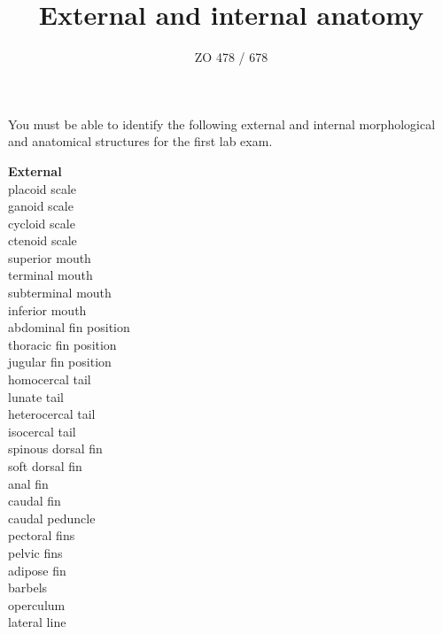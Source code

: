 \documentclass[12pt, hidelinks]{exam}
\title{External and internal anatomy}
\author{ZO 478 / 678}
\date{}                                           %
\begin{document}
You must be able to identify the following external and internal morphological and anatomical structures for the first lab exam.

\noindent\begin{multicols}{3}
\columnbreak\textbf{External} \\
placoid scale \\
ganoid scale \\
cycloid scale \\
ctenoid scale \\
superior mouth  \\
terminal mouth  \\
subterminal mouth  \\
inferior mouth  \\
abdominal fin position \\
thoracic fin position \\
jugular fin position \\
homocercal tail \\
lunate tail \\
heterocercal tail \\
isocercal tail \\
spinous dorsal fin \\
soft dorsal fin \\
anal fin \\
caudal fin \\
caudal peduncle \\
pectoral fins \\
pelvic fins \\
adipose fin \\
barbels \\
operculum \\
lateral line \\


\end{multicols}
\end{document}
